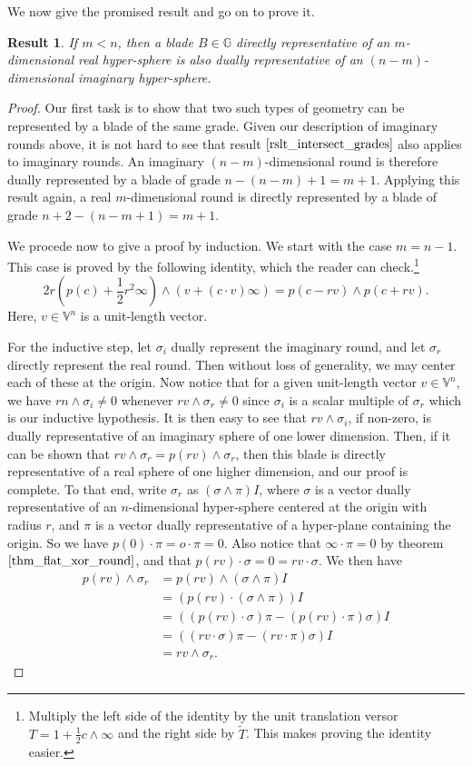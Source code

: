 \documentclass[12pt]{article}
\newcommand{\G}{\mathbb{G}}
\newcommand{\V}{\mathbb{V}}
\newcommand{\nvao}{o}
\newcommand{\nvai}{\infty}
\newtheorem{result}{Result}[section]
\begin{document}
We now give the promised result and go on to prove it.
\begin{result}
If $m<n$, then a blade $B\in\G$ directly representative of an $m$-dimensional real hyper-sphere
is also dually representative of an $(n-m)$-dimensional imaginary hyper-sphere.
\end{result}
\begin{proof}
Our first task is to show that two such types of geometry can be represented by
a blade of the same grade.  Given our description of imaginary rounds above,
it is not hard to see that result $\eqref{rslt_intersect_grades}$ also applies to imaginary rounds.
An imaginary $(n-m)$-dimensional round is therefore dually represented by a blade
of grade $n-(n-m)+1=m+1$.  Applying this result again, a real $m$-dimensional round
is directly represented by a blade of grade $n+2-(n-m+1)=m+1$.

We procede now to give a proof by induction.  We start with the case $m=n-1$.
This case is proved by the following identity, which the reader can check.\footnote{
Multiply the left side of the identity by the unit translation versor $T=1+\frac{1}{2}c\wedge\nvai$ and the right
side by $\tilde{T}$.  This makes proving the identity easier.}
\begin{equation*}
2r(p(c)+\frac{1}{2}r^2\nvai)\wedge(v+(c\cdot v)\nvai) = p(c-rv)\wedge p(c+rv).
\end{equation*}
Here, $v\in\V^n$ is a unit-length vector.

For the inductive step, let $\sigma_i$ dually represent the imaginary round,
and let $\sigma_r$ directly represent the real round.  Then without loss of generality,
we may center each of these at the origin.  Now notice that for a given unit-length
vector $v\in\V^n$, we have $rn\wedge\sigma_i\neq 0$ whenever $rv\wedge\sigma_r\neq 0$
since $\sigma_i$ is a scalar multiple of $\sigma_r$ which is our inductive hypothesis.
It is then easy to see that $rv\wedge\sigma_i$, if non-zero,
is dually representative of an imaginary sphere of one lower dimension.  Then, if
it can be shown that $rv\wedge\sigma_r=p(rv)\wedge\sigma_r$, then this blade is directly representative
of a real sphere of one higher dimension, and our proof is complete.  To that end,
write $\sigma_r$ as $(\sigma\wedge\pi)I$, where $\sigma$ is a vector dually representative
of an $n$-dimensional hyper-sphere centered at the origin with radius $r$, and
$\pi$ is a vector dually representative of a hyper-plane containing the origin.
So we have $p(0)\cdot\pi=\nvao\cdot\pi=0$.  Also notice that $\nvai\cdot\pi=0$
by theorem $\eqref{thm_flat_xor_round}$, and that $p(rv)\cdot\sigma=0=rv\cdot\sigma$.  We then have
\begin{align*}
p(rv)\wedge\sigma_r &= p(rv)\wedge(\sigma\wedge\pi)I \\
 &= (p(rv)\cdot(\sigma\wedge\pi))I \\
 &= ((p(rv)\cdot\sigma)\pi - (p(rv)\cdot\pi)\sigma)I \\
 &= ((rv\cdot\sigma)\pi - (rv\cdot\pi)\sigma)I \\
 &= rv\wedge\sigma_r.
\end{align*}
\end{proof}
\end{document}
